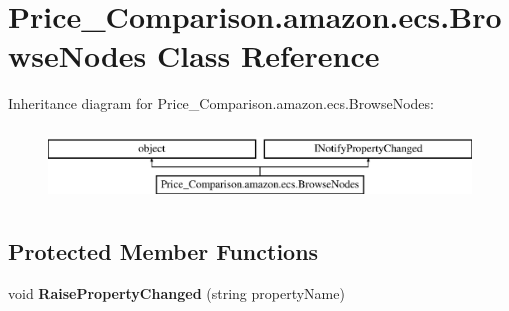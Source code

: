 \hypertarget{class_price___comparison_1_1amazon_1_1ecs_1_1_browse_nodes}{\section{Price\-\_\-\-Comparison.\-amazon.\-ecs.\-Browse\-Nodes Class Reference}
\label{class_price___comparison_1_1amazon_1_1ecs_1_1_browse_nodes}
}


 


Inheritance diagram for Price\-\_\-\-Comparison.\-amazon.\-ecs.\-Browse\-Nodes\-:\begin{figure}[H]
\begin{center}
\leavevmode
\includegraphics[height=2.000000cm]{class_price___comparison_1_1amazon_1_1ecs_1_1_browse_nodes}
\end{center}
\end{figure}
\subsection*{Protected Member Functions}
\begin{DoxyCompactItemize}
\item 
\hypertarget{class_price___comparison_1_1amazon_1_1ecs_1_1_browse_nodes_ad6ed910c6d7de908d74f34d7369ab803}{void {\bfseries Raise\-Property\-Changed} (string property\-Name)}\label{class_price___comparison_1_1amazon_1_1ecs_1_1_browse_nodes_ad6ed910c6d7de908d74f34d7369ab803}

\end{DoxyCompactItemize}
